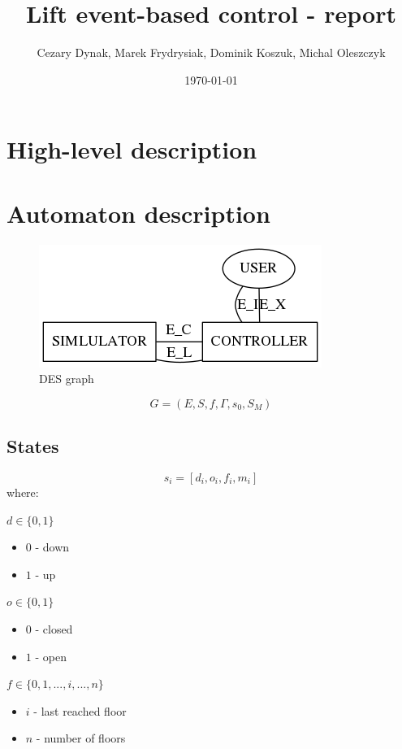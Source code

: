 \documentclass{article}
\begin{document}
\title{Lift event-based control - report}
\author{Cezary Dynak, Marek Frydrysiak, Dominik Koszuk, Michal Oleszczyk} 
\date{\today}
\maketitle

\section{High-level description}

\section{Automaton description}

\begin{figure}
  \centering
  \includegraphics{img/simulator_controller.png}
  \caption{DES graph}
\end{figure}

\[
G = (E, S, f, \Gamma, s_0, S_M)
\]

\subsection{States}

\[
s_i = [d_i, o_i, f_i, m_i]
\]
where:

\(d \in \{0,1\}\)
\begin{itemize}
  \item \(0\) - down
  \item \(1\) - up
\end{itemize}

\(o \in \{0,1\}\)
\begin{itemize}
  \item \(0\) - closed
  \item \(1\) - open
\end{itemize}

\(f \in \{0,1,...,i,...,n\}\)
\begin{itemize}
  \item \(i\) - last reached floor
  \item \(n\) - number of floors
\end{itemize}
\end{document}
